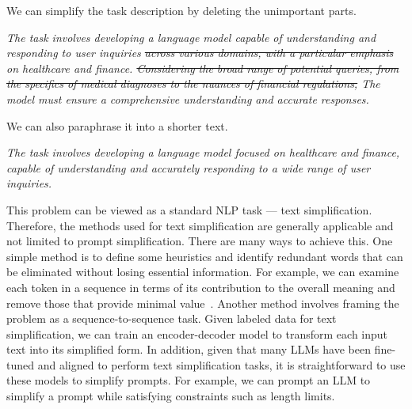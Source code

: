 We can simplify the task description by deleting the unimportant parts.

\vspace{0.5em}

\begin{center}
\parbox{0.8\linewidth}{
\textit{The task involves developing a language model capable of understanding and responding to user inquiries {\color{gray} \sout{across various domains, with a particular emphasis}} on healthcare and finance. {\color{gray} \sout{Considering the broad range of potential queries, from the specifics of medical diagnoses to the nuances of financial regulations,}} The model must ensure a comprehensive understanding and accurate responses.}
}
\end{center}

\vspace{0.5em}

We can also paraphrase it into a shorter text.

\vspace{0.5em}

\begin{center}
\parbox{0.8\linewidth}{
\textit{The task involves developing a language model focused on healthcare and finance, capable of understanding and accurately responding to a wide range of user inquiries.}
}
\end{center}

\vspace{0.5em}

This problem can be viewed as a standard NLP task --- text simplification. Therefore, the methods used for text simplification are generally applicable and not limited to prompt simplification. There are many ways to achieve this. One simple method is to define some heuristics and identify redundant words that can be eliminated without losing essential information. For example, we can examine each token in a sequence in terms of its contribution to the overall meaning and remove those that provide minimal value~\cite{li-etal:2023compressing,jiang-etal:2023llmlingua}. Another method involves framing the problem as a sequence-to-sequence task. Given labeled data for text simplification, we can train an encoder-decoder model to transform each input text into its simplified form. In addition, given that many LLMs have been fine-tuned and aligned to perform text simplification tasks, it is straightforward to use these models to simplify prompts. For example, we can prompt an LLM to simplify a prompt while satisfying constraints such as length limits.

